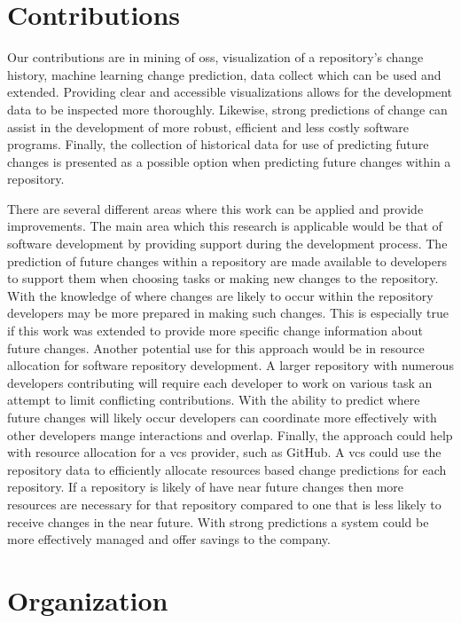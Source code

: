 \section{Contributions}

Our contributions are in mining of \gls{oss}, visualization of a repository's change history, machine learning change prediction, data collect which can be used and extended. Providing clear and accessible visualizations allows for the development data to be inspected more thoroughly. Likewise, strong predictions of change can assist in the development of more robust, efficient and less costly software programs. Finally, the collection of historical data for use of predicting future changes is presented as a possible option when predicting future changes within a repository.

There are several different areas where this work can be applied and provide improvements. The main area which this research is applicable would be that of software development by providing support during the development process. The prediction of future changes within a repository are made available to developers to support them when choosing tasks or making new changes to the repository. With the knowledge of where changes are likely to occur within the repository developers may be more prepared in making such changes. This is especially true if this work was extended to provide more specific change information about future changes. Another potential use for this approach would be in resource allocation for software repository development. A larger repository with numerous developers contributing will require each developer to work on various task an attempt to limit conflicting contributions. With the ability to predict where future changes will likely occur developers can coordinate more effectively with other developers mange interactions and overlap. Finally, the approach could help with resource allocation for a \gls{vcs} provider, such as GitHub. A \gls{vcs} could use the repository data to efficiently allocate resources based change predictions for each repository. If a repository is likely of have near future changes then more resources are necessary for that repository compared to one that is less likely to receive changes in the near future. With strong predictions a system could be more effectively managed and offer savings to the company.

\section{Organization}

